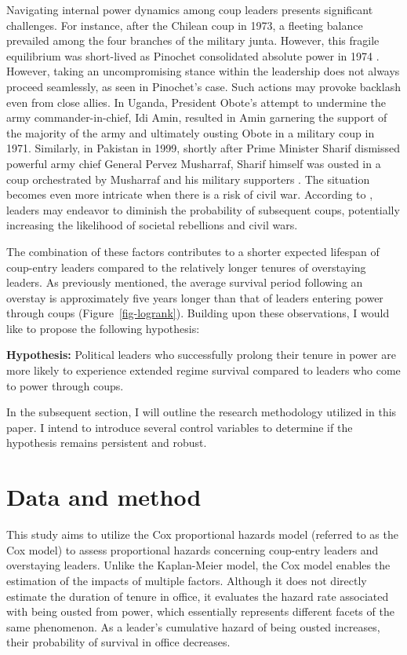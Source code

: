 \documentclass[
  12pt,
  a4paper,
  12pt]{article}
\begin{document}
Navigating internal power dynamics among coup leaders presents
significant challenges. For instance, after the Chilean coup in 1973, a
fleeting balance prevailed among the four branches of the military
junta. However, this fragile equilibrium was short-lived as Pinochet
consolidated absolute power in 1974 \citep{geddes2018}. However, taking
an uncompromising stance within the leadership does not always proceed
seamlessly, as seen in Pinochet's case. Such actions may provoke
backlash even from close allies. In Uganda, President Obote's attempt to
undermine the army commander-in-chief, Idi Amin, resulted in Amin
garnering the support of the majority of the army and ultimately ousting
Obote in a military coup in 1971. Similarly, in Pakistan in 1999,
shortly after Prime Minister Sharif dismissed powerful army chief
General Pervez Musharraf, Sharif himself was ousted in a coup
orchestrated by Musharraf and his military supporters
\citep{sudduth2017}. The situation becomes even more intricate when
there is a risk of civil war. According to \citet{roessler2011}, leaders
may endeavor to diminish the probability of subsequent coups,
potentially increasing the likelihood of societal rebellions and civil
wars.

The combination of these factors contributes to a shorter expected
lifespan of coup-entry leaders \citep{dahl2023} compared to the
relatively longer tenures of overstaying leaders. As previously
mentioned, the average survival period following an overstay is
approximately five years longer than that of leaders entering power
through coups (Figure~\ref{fig-logrank}). Building upon these
observations, I would like to propose the following hypothesis:

\textbf{Hypothesis:} Political leaders who successfully prolong their
tenure in power are more likely to experience extended regime survival
compared to leaders who come to power through coups.

In the subsequent section, I will outline the research methodology
utilized in this paper. I intend to introduce several control variables
to determine if the hypothesis remains persistent and robust.

\section{Data and method}\label{data-and-method}

This study aims to utilize the Cox proportional hazards model (referred
to as the Cox model) to assess proportional hazards concerning
coup-entry leaders and overstaying leaders. Unlike the Kaplan-Meier
model, the Cox model enables the estimation of the impacts of multiple
factors. Although it does not directly estimate the duration of tenure
in office, it evaluates the hazard rate associated with being ousted
from power, which essentially represents different facets of the same
phenomenon. As a leader's cumulative hazard of being ousted increases,
their probability of survival in office decreases.
\end{document}
